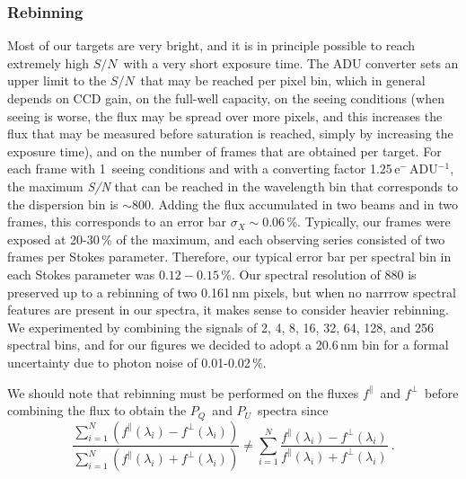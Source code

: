 \documentclass[a4paper]{aa}
\newcommand{\pq}{\ensuremath{P_Q}}
\newcommand{\pu}{\ensuremath{P_U}}
\newcommand{\fo}{\ensuremath{f^\parallel}}
\newcommand{\fe}{\ensuremath{f^\perp}}
\newcommand{\snr}{\ensuremath{S/N}}
\begin{document}
\subsubsection{Rebinning}
Most of our targets are very bright, and it is in principle possible to reach
extremely high \snr\ with a very short exposure time. The ADU converter
sets an upper limit to the \snr\ that may be reached per pixel bin, which in general
depends on CCD gain, on the full-well capacity, on the seeing conditions
(when seeing is worse, the flux may be spread over more
pixels, and this increases the flux that may be measured before
saturation is reached, simply by increasing the exposure time), and on the number of
frames that are obtained
per target.  For each frame with 1\arcsec\ seeing conditions and with a converting
factor 1.25\,e$^{-}$\,ADU$^{-1}$, the maximum {\it S/N} that can be reached
in the wavelength bin that corresponds to the dispersion bin is $\sim 800$.
Adding the flux accumulated in two beams and
in two frames, this corresponds to an error bar $\sigma_X \sim
0.06$\,\%. Typically, our frames were exposed at 20-30\,\% of the
maximum, and each observing series consisted of two frames per Stokes parameter.
Therefore, our typical error bar per spectral bin in each Stokes
parameter was $0.12-0.15$\,\%. Our spectral resolution of 880 is preserved up to
a rebinning of two 0.161\,nm pixels, but when no narrrow spectral features are
present in our spectra, it makes sense to consider heavier rebinning.
We experimented by combining
the signals of 2, 4, 8, 16, 32, 64, 128, and 256 spectral bins, and for our
figures we decided to adopt a 20.6\,nm bin for a formal
uncertainty due to photon noise of 0.01-0.02\,\%.

We should note that rebinning must be performed on the fluxes \fo\ and
\fe\ before combining the flux to obtain the \pq\ and \pu\ spectra since
\[
\frac{\sum_{i=1}^{N} \left(\fo(\lambda_i)-\fe(\lambda_i)\right)}{\sum_{i=1}^{N} \left(\fo(\lambda_i)+\fe(\lambda_i)\right)}
\neq
\sum_{i=1}^{N}\frac{\fo(\lambda_i)-\fe(\lambda_i)}{\fo(\lambda_i)+\fe(\lambda_i)} \ .
\]
\end{document}
